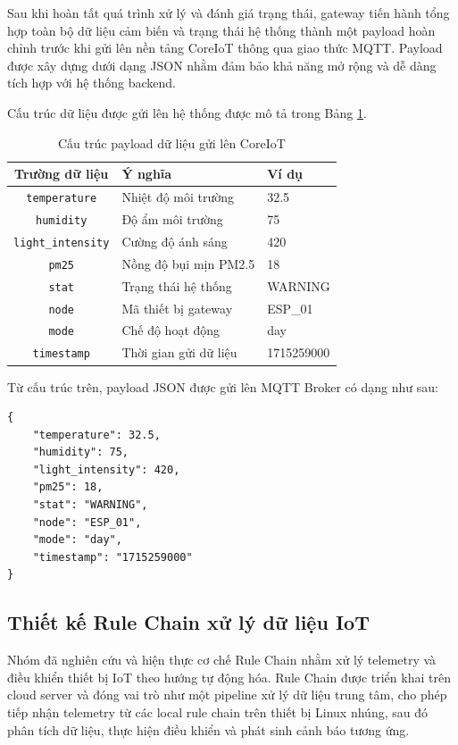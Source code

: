 Sau khi hoàn tất quá trình xử lý và đánh giá trạng thái, gateway tiến hành tổng hợp toàn bộ dữ liệu cảm biến và trạng thái hệ thống thành một payload hoàn chỉnh trước khi gửi lên nền tảng CoreIoT thông qua giao thức MQTT. Payload được xây dựng dưới dạng JSON nhằm đảm bảo khả năng mở rộng và dễ dàng tích hợp với hệ thống backend.

Cấu trúc dữ liệu được gửi lên hệ thống được mô tả trong Bảng \ref{tab:api_payload}.

\begin{table}[H]
\centering
\begin{tabular}{|c|l|l|}
\hline
\textbf{Trường dữ liệu} & \textbf{Ý nghĩa} & \textbf{Ví dụ} \\ \hline
\texttt{temperature} & Nhiệt độ môi trường & 32.5 \\ \hline
\texttt{humidity} & Độ ẩm môi trường & 75 \\ \hline
\texttt{light\_intensity} & Cường độ ánh sáng & 420 \\ \hline
\texttt{pm25} & Nồng độ bụi mịn PM2.5 & 18 \\ \hline
\texttt{stat} & Trạng thái hệ thống & WARNING \\ \hline
\texttt{node} & Mã thiết bị gateway & ESP\_01 \\ \hline
\texttt{mode} & Chế độ hoạt động & day \\ \hline
\texttt{timestamp} & Thời gian gửi dữ liệu & 1715259000 \\ \hline
\end{tabular}
\caption{Cấu trúc payload dữ liệu gửi lên CoreIoT}
\label{tab:api_payload}
\end{table}

Từ cấu trúc trên, payload JSON được gửi lên MQTT Broker có dạng như sau:

\begin{verbatim}
{
    "temperature": 32.5,
    "humidity": 75,
    "light_intensity": 420,
    "pm25": 18,
    "stat": "WARNING",
    "node": "ESP_01",
    "mode": "day",
    "timestamp": "1715259000"
}
\end{verbatim}

\subsection{Thiết kế Rule Chain xử lý dữ liệu IoT}
Nhóm đã nghiên cứu và hiện thực cơ chế Rule Chain nhằm xử lý telemetry và điều khiển thiết bị IoT theo hướng tự động hóa. Rule Chain được triển khai trên cloud server và đóng vai trò như một pipeline xử lý dữ liệu trung tâm, cho phép tiếp nhận telemetry từ các local rule chain trên thiết bị Linux nhúng, sau đó phân tích dữ liệu, thực hiện điều khiển và phát sinh cảnh báo tương ứng. 

